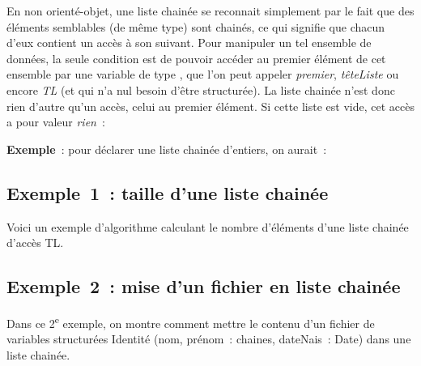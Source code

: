 	En non orienté-objet, une liste chainée se reconnait simplement 
	par le fait que des éléments semblables (de même type)
	sont chainés, ce qui signifie que chacun d'eux contient un accès 
	à son suivant. Pour manipuler un tel ensemble de
	données, la seule condition est de pouvoir accéder au premier 
	élément de cet ensemble par une variable de type ,
	que l'on peut appeler \textit{premier}, \textit{têteListe} ou encore 
	\textit{TL} (et qui n'a nul besoin d'être
	structurée). La liste chainée n'est donc rien d'autre qu'un accès, 
	celui au premier élément. Si cette liste est vide,
	cet accès a pour valeur \textit{rien}~:


	\textbf{Exemple}~: pour déclarer une liste chainée d'entiers, on aurait~:


	\subsection{Exemple~1~: taille d'une liste chainée}
	
		Voici un exemple d'algorithme calculant le nombre 
		d'éléments d'une liste chainée d'accès TL.
		
			
	\subsection{Exemple~2~: mise d'un fichier en liste chainée}
		
		Dans ce 2\textsuperscript{e} exemple, on montre comment mettre 
		le contenu d'un fichier de variables structurées
		Identité (nom, prénom~: chaines, dateNais~: Date) dans une liste chainée.
		
